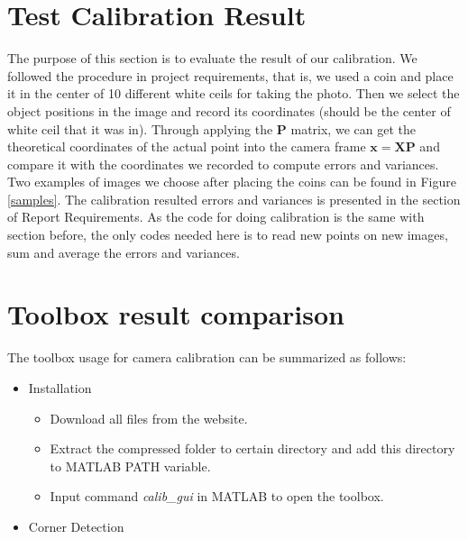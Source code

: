 \documentclass[conference]{IEEEtran}
\newcommand{\mat}[1]{\mathbf{#1}} %
\begin{document}
\section{Test Calibration Result}
The purpose of this section is to evaluate the result of our calibration. We followed the procedure in project requirements, that is, we used a coin and place it in the center of 10 different white ceils for taking the photo. Then we select the object positions in the image and record its coordinates (should be the center of white ceil that it was in). Through applying the $\mat{P}$ matrix, we can get the theoretical coordinates of the actual point into the camera frame $\mat{x} = \mat{X}\mat{P}$ and compare it with the coordinates we recorded to compute errors and variances. Two examples of images we choose after placing the coins can be found in Figure \ref{samples}. The calibration resulted errors and variances is presented in the section of Report Requirements. As the code for doing calibration is the same with section before, the only codes needed here is to read new points on new images, sum and average the errors and variances.
\begin{figure*}[!hbpt]
  \caption{Sample images we took for testing calibration}
  \label{samples} %
\end{figure*}

\section{Toolbox result comparison}
The toolbox usage for camera calibration can be summarized as follows:
\begin{itemize}
	\item Installation
	\begin{itemize}
		\item Download all files from the website.
		\item Extract the compressed folder to certain directory and add this directory to MATLAB PATH variable.
		\item Input command \emph{calib_gui} in MATLAB to open the toolbox.
	\end{itemize}
	\item Corner Detection
\end{itemize}
\end{document}
